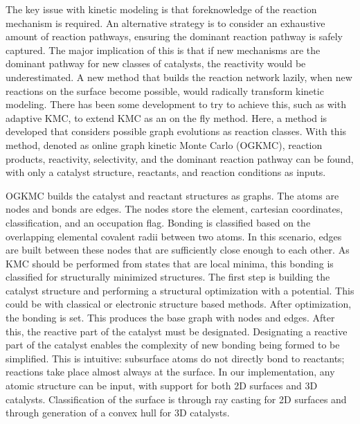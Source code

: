\documentclass[journal=jacsat,manuscript=article]{achemso}
\begin{document}
The key issue with kinetic modeling is that foreknowledge of the reaction mechanism is required.
An alternative strategy is to consider an exhaustive amount of reaction pathways, ensuring the dominant reaction pathway is safely captured.
The major implication of this is that if new mechanisms are the dominant pathway for new classes of catalysts, the reactivity would be underestimated.
A new method that builds the reaction network lazily, when new reactions on the surface become possible, would radically transform kinetic modeling.
There has been some development to try to achieve this, such as with adaptive KMC, to extend KMC as an on the fly method.
Here, a method is developed that considers possible graph evolutions as reaction classes.
With this method, denoted as online graph kinetic Monte Carlo (OGKMC), reaction products, reactivity, selectivity, and the dominant reaction pathway can be found, with only a catalyst structure, reactants, and reaction conditions as inputs.


OGKMC builds the catalyst and reactant structures as graphs.
The atoms are nodes and bonds are edges.
The nodes store the element, cartesian coordinates, classification, and an occupation flag.
Bonding is classified based on the overlapping elemental covalent radii between two atoms.
In this scenario, edges are built between these nodes that are sufficiently close enough to each other.
As KMC should be performed from states that are local minima, this bonding is classified for structurally minimized structures.
The first step is building the catalyst structure and performing a structural optimization with a potential.
This could be with classical or electronic structure based methods.
After optimization, the bonding is set.
This produces the base graph with nodes and edges.
After this, the reactive part of the catalyst must be designated.
Designating a reactive part of the catalyst enables the complexity of new bonding being formed to be simplified.
This is intuitive: subsurface atoms do not directly bond to reactants; reactions take place almost always at the surface.
In our implementation, any atomic structure can be input, with support for both 2D surfaces and 3D catalysts.
Classification of the surface is through ray casting for 2D surfaces and through generation of a convex hull for 3D catalysts.
\end{document}
